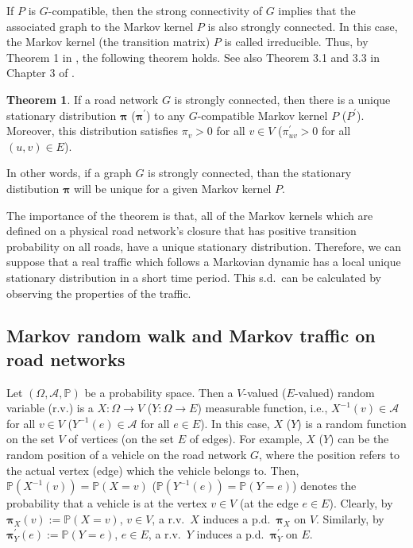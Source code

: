 \documentclass[b5paper,12pt]{report}
\theoremstyle{definition}
\newtheorem{Thm}{Theorem}
\newcommand{\bpi}{\boldsymbol{\pi}}
\newcommand{\PP}{\mathbb{P}}
\begin{document}
If $P$ is $G$-compatible, then the strong connectivity of $G$ implies that the associated graph to the Markov kernel $P$ is also strongly connected. In this case, the Markov kernel (the transition matrix) $P$ is called irreducible. Thus, by Theorem 1 in \cite{jarvis1999graph}, the following theorem holds. See also Theorem 3.1 and 3.3 in Chapter 3 of \cite{Bremaud1999}.

\begin{Thm}\label{statsol}
If a road network $G$ is strongly connected, then there is a unique stationary distribution $\bpi$ ($\bpi^\prime$) to any $G$-compatible Markov kernel $P$ ($P^\prime$). Moreover, this distribution satisfies $\pi_v>0$ for all $v\in V$ ($\pi^\prime_{uv} >0$ for all $(u,v)\in E$).
\end{Thm}

In other words, if a graph $G$ is strongly connected, than the stationary distibution $\bpi$ will be unique for a given Markov kernel $P$.

The importance of the theorem is that, all of the Markov kernels which are defined on a physical road network's closure that has positive transition probability on all roads, have a unique stationary distribution. Therefore, we can suppose that a real traffic which follows a Markovian dynamic has a local unique stationary distribution in a short time period. This s.d.~can be calculated by observing the properties of the traffic.

\subsection{Markov random walk and Markov traffic on road networks} 
\label{Markov_traffic}

Let $(\Omega,\mathcal{A},\PP)$ be a probability space. Then a $V$-valued ($E$-valued) random variable (r.v.) is a $X:\Omega\to V$ ($Y:\Omega\to E$) measurable function, i.e., $X^{-1}(v)\in\mathcal{A}$ for all $v\in V$ ($Y^{-1}(e)\in\mathcal{A}$ for all $e\in E$). In this case, $X$ ($Y$) is a random function on the set $V$ of vertices (on the set $E$ of edges). For example, $X$ ($Y$) can be the random position of a vehicle on the road network $G$, where the position refers to the actual vertex (edge) which the vehicle belongs to. Then, $\PP(X^{-1}(v))=\PP(X=v)$ ($\PP(Y^{-1}(e))=\PP(Y=e)$) denotes the probability that a vehicle is at the vertex $v\in V$ (at the edge $e\in E$). Clearly, by $\bpi_X(v):= \PP(X=v)$, $v\in V$, a r.v.~$X$ induces a p.d.~$\bpi_X$ on $V$. Similarly, by $\bpi^\prime_Y(e):= \PP(Y=e)$, $e\in E$, a r.v.~$Y$ induces a p.d.~$\bpi^\prime_Y$ on $E$. 
\end{document}
